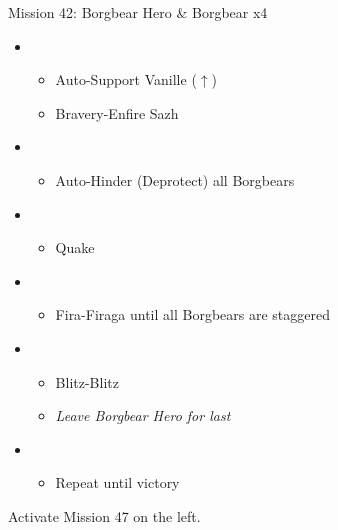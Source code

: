 \begin{battle}{Mission 42: Borgbear Hero \& Borgbear x4}
	\begin{itemize}
		\item \third
			\begin{itemize}
				\item Auto-Support Vanille ($\uparrow$)
				\item Bravery-Enfire Sazh
			\end{itemize}
		\item \fifth
			\begin{itemize}
				\item Auto-Hinder (Deprotect) all Borgbears
			\end{itemize}
		\item \first
			\begin{itemize}
				\item Quake
			\end{itemize}
		\item \sixth
			\begin{itemize}
				\item Fira-Firaga until all Borgbears are staggered
			\end{itemize}
		\item \first
			\begin{itemize}
				\item Blitz-Blitz
				\item \textit{Leave Borgbear Hero for last}
			\end{itemize}	
		\item \second
			\begin{itemize}
				\item Repeat until victory
			\end{itemize}																			
	\end{itemize}
\end{battle}

Activate Mission 47 on the left.
\vfill

